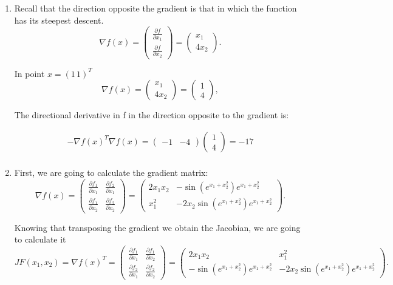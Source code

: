 \begin{enumerate}
\item Recall that the direction opposite the gradient is that in which the function has its steepest descent.
$$\nabla f(x)
=
\begin{pmatrix}
\frac{\partial f}{\partial x_1}\\
\frac{\partial f}{\partial x_2}
\end{pmatrix}
=
\begin{pmatrix}
x_1\\
4x_2
\end{pmatrix}.$$

In point $x=(1 \, 1)^T$
\[
\nabla f(x)
=
\begin{pmatrix}
x_1\\
4x_2
\end{pmatrix}
=
\begin{pmatrix}
1\\
4
\end{pmatrix},
\]

The directional derivative in f in the direction opposite to the gradient is:

\begin{align*}
-\nabla f(x)^T \nabla f(x)= \begin{pmatrix}
-1 & -4
\end{pmatrix}
\begin{pmatrix}
1\\
4
\end{pmatrix}
=
-17\\
\end{align*}

\item First, we are going to calculate the gradient matrix:
\[
\nabla f(x)
=
\begin{pmatrix}
   \frac{\partial f_1}{\partial x_1}      & \frac{\partial f_2}{\partial x_1} \\
    \frac{\partial f_1}{\partial x_2}       & \frac{\partial f_2}{\partial x_2}
\end{pmatrix}
=
\begin{pmatrix}
   2x_1x_2      & -\sin(e^{x_1+x_2^2})e^{x_1+x_2^2} \\
    x_1^2      & -2x_2\sin(e^{x_1+x_2^2})e^{x_1+x_2^2}
    \end{pmatrix}.
\]

Knowing that transposing the gradient we obtain the Jacobian, we are going to calculate it
\[
   JF(x_1,x_2)=\nabla f(x)^T
=
\begin{pmatrix}
   \frac{\partial f_1}{\partial x_1}      & \frac{\partial f_1}{\partial x_2} \\
    \frac{\partial f_2}{\partial x_1}       & \frac{\partial f_2}{\partial x_2}
\end{pmatrix}
=
\begin{pmatrix}
   2x_1x_2      &   x_1^2 \\
    -\sin(e^{x_1+x_2^2})e^{x_1+x_2^2}    & -2x_2\sin(e^{x_1+x_2^2})e^{x_1+x_2^2}
\end{pmatrix}.
\]




\end{enumerate}
